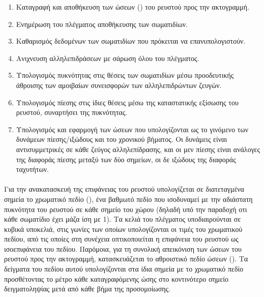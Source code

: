 \begin{enumerate}
\item Καταγραφή και αποθήκευση των ώσεων () του ρευστού προς την ακτογραμμή.

\item Ενημέρωση του πλέγματος αποθήκευσης των σωματιδίων.

\item Καθαρισμός δεδομένων των σωματιδίων που πρόκειται να επανυπολογιστούν.

\item Ανιχνευση αλληλεπιδράσεων με σάρωση όλου του πλέγματος.

\item Υπολογισμός πυκνότητας στις θέσεις των σωματιδίων μέσω προοδευτικής άθροισης των
  αμοιβαίων συνεισφορών των αλληλεπιδρώντων ζευγών.

\item Υπολογισμός πίεσης στις ίδιες θέσεις μέσω της καταστατικής εξίσωσης του ρευστού,
  συναρτήσει της πυκνότητας.

\item Υπολογισμός και εφαρμογή των ώσεων που υπολογίζονται ως το γινόμενο των δυνάμεων
  πίεσης/ιξώδους και του χρονικού βήματος. Οι δυνάμεις είναι αντισυμμετρικές σε κάθε
  ζεύγος αλληλεπίδρασης, και οι μεν πίεσης είναι ανάλογες της διαφοράς πίεσης μεταξύ των
  δύο σημείων, οι δε ιξώδους της διαφοράς ταχυτήτων.
\end{enumerate}

\paragraph{} Για την ανακατασκευή της επιφάνειας του ρευστού υπολογίζεται σε διατεταγμένα
σημεία το χρωματικό πεδίο (), ένα βαθμωτό πεδίο που ισοδυναμεί με την
αδιάστατη πυκνότητα του ρευστού σε κάθε σημείο του χώρου (δηλαδή υπό την παραδοχή οτι κάθε
σωματίδιο έχει μάζα ίση με 1). Τα κελιά του πλέγματος υποδιαιρούνται σε κυβικά υποκελιά,
στις γωνίες των οποίων υπολογίζονται οι τιμές του χρωματικού πεδίου, από τις οποίες στη
συνέχεια οπτικοποιείται η επιφάνεια του ρευστού ως ισοεπιφάνεια του πεδίου. Παρόμοια, για
τη συνολική απεικόνιση των ώσεων του ρευστού προς την ακτογραμμή, κατασκευάζεται το
αθροιστικό πεδίο ώσεων (). Τα δείγματα του πεδίου αυτού υπολογίζονται
στα ίδια σημεία με το χρωματικό πεδίο προσθέτοντας το μέτρο κάθε καταγραφόμενης ώσης στο
κοντινότερο σημείο δειγματοληψίας μετά από κάθε βήμα της προσομοίωσης.

